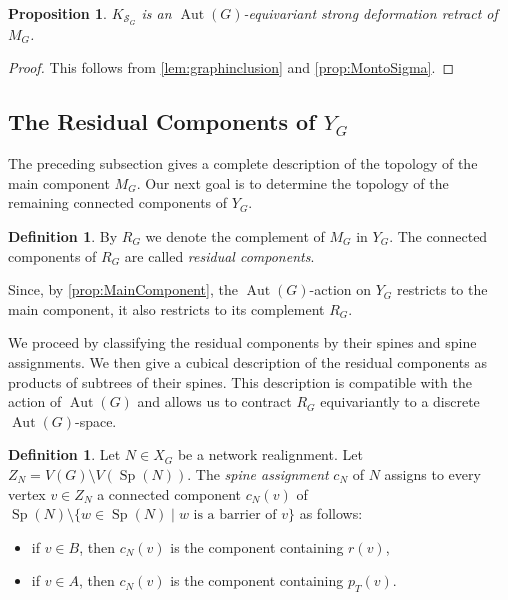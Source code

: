 \documentclass[reqno,dvipsnames]{amsart}
\theoremstyle{plain}
\newtheorem{proposition}[theorem]{Proposition}
\numberwithin{equation}{section}
\theoremstyle{definition}
\newtheorem{definition}[theorem]{Definition}
\DeclareMathOperator{\Sp}{Sp}
\DeclareMathOperator{\Aut}{Aut}
\begin{document}
\begin{proposition}\label{MainCptKn}
	$K_{\mathcal{S}_G}$ is an $\Aut(G)$-equivariant strong deformation retract of $M_G$.
\end{proposition}

\begin{proof}
	This follows from \autoref{lem:graphinclusion} and \autoref{prop:MontoSigma}. 
\end{proof}




\subsection{The Residual Components of \texorpdfstring{$Y_G$}{Y_G}}\label{sec:residual}

The preceding subsection gives a complete description of the topology of the main component $M_G$. Our next goal is to determine the topology of the remaining connected components of $Y_G$. 

\begin{definition}
	By $R_G$ we denote the complement of $M_G$ in $Y_G$. The connected components of $R_G$ are called \textit{residual components}.
	
	Since, by \autoref{prop:MainComponent}, the $\Aut(G)$-action on $Y_G$ restricts to the main component, it also restricts to its complement $R_G$.
\end{definition}

We proceed by classifying the residual components by their spines and spine assignments. We then give a cubical description of the residual components as products of subtrees of their spines. This description is compatible with the action of $\Aut(G)$ and allows us to contract $R_G$ equivariantly to a discrete $\Aut(G)$-space.

\begin{definition}
	Let $N\in X_G$ be a network realignment. Let $Z_N = V(G)\setminus V(\Sp(N))$. The \textit{spine assignment} $c_N$ of $N$ assigns to every vertex $v\in Z_N$ a connected component $c_N(v)$ of $\Sp(N)\setminus \{w\in \Sp(N) \mid w \text{ is a barrier of }v\}$ as follows:
	\begin{itemize}
		\item if $v \in B$, then $c_N(v)$ is the component containing $r(v)$,
		\item if $v\in A$, then $c_N(v)$ is the component containing $p_T(v)$.
	\end{itemize}
\end{definition}
\end{document}
